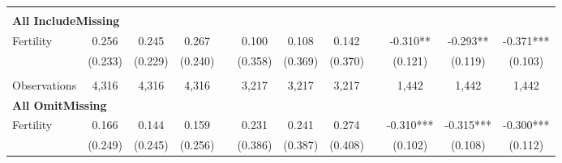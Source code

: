 \begin{landscape}
\begin{table}[htpb!]
\begin{center}
\begin{tabular}{lcccp{2mm}cccp{2mm}ccc}
\begin{footnotesize}\end{footnotesize}\\ 
\multicolumn{12}{l}{\textbf{All IncludeMissing}}\\ 
Fertility&0.256&0.245&0.267&&0.100&0.108&0.142&&-0.310**&-0.293**&-0.371***\\
&(0.233)&(0.229)&(0.240)&&(0.358)&(0.369)&(0.370)&&(0.121)&(0.119)&(0.103)\\
\begin{footnotesize}\end{footnotesize}&\begin{footnotesize}\end{footnotesize}&\begin{footnotesize}\end{footnotesize}&\begin{footnotesize}\end{footnotesize}&\begin{footnotesize}\end{footnotesize}&\begin{footnotesize}\end{footnotesize}&\begin{footnotesize}\end{footnotesize}&\begin{footnotesize}\end{footnotesize}&\begin{footnotesize}\end{footnotesize}&\begin{footnotesize}\end{footnotesize}&\begin{footnotesize}\end{footnotesize}&\begin{footnotesize}\end{footnotesize}\\Observations&4,316&4,316&4,316&&3,217&3,217&3,217&&1,442&1,442&1,442\\
\multicolumn{12}{l}{\textbf{All OmitMissing}}\\ 
Fertility&0.166&0.144&0.159&&0.231&0.241&0.274&&-0.310***&-0.315***&-0.300***\\
&(0.249)&(0.245)&(0.256)&&(0.386)&(0.387)&(0.408)&&(0.102)&(0.108)&(0.112)\\

\end{tabular}
\end{center}
\end{table}
\end{landscape}
